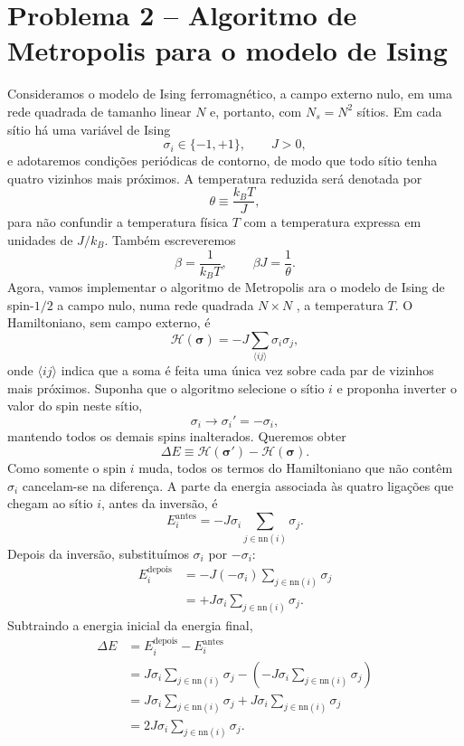 \documentclass[12pt,a4paper]{article}
\newcommand{\nn}{\mathrm{nn}}
\newcommand{\thetaT}{\theta}
\begin{document}
\section*{Problema 2 -- Algoritmo de Metropolis para o modelo de Ising}
%
Consideramos o modelo de Ising ferromagnético, a campo externo nulo, em uma rede quadrada de tamanho linear $N$ e, portanto, com $N_s=N^2$ sítios. Em cada sítio há uma variável de Ising
\[
    \sigma_i\in\{-1,+1\},\qquad J>0,
\]
e adotaremos condições periódicas de contorno, de modo que todo sítio tenha quatro vizinhos mais próximos. A temperatura reduzida será denotada por
\[
    \thetaT\equiv \frac{k_B T}{J},
\]
para não confundir a temperatura física $T$ com a temperatura expressa em unidades de $J/k_B$. Também escreveremos
\[
    \beta=\frac{1}{k_BT},\qquad \beta J=\frac{1}{\thetaT}.
\]
Agora, vamos implementar o algoritmo de Metropolis ara o modelo de Ising de spin-$1/2$ a campo nulo, numa rede quadrada $N \times N$ , a temperatura $T$. O Hamiltoniano, sem campo externo, é
%
\begin{equation}
    \mathcal H(\bm\sigma)
    =-J\sum_{\langle ij\rangle}\sigma_i\sigma_j,
    \label{eq:hamiltoniano}
\end{equation}
%
onde $\langle ij\rangle$ indica que a soma é feita uma única vez sobre cada par de vizinhos mais próximos. Suponha que o algoritmo selecione o sítio $i$ e proponha inverter o valor do spin neste sítio,
%
\begin{equation}
    \sigma_i\longrightarrow \sigma_i'=-\sigma_i,
\end{equation}
%
mantendo todos os demais spins inalterados. Queremos obter
%
\[
    \Delta E\equiv \mathcal H(\bm\sigma')-\mathcal H(\bm\sigma).
\]
%
Como somente o spin $i$ muda, todos os termos do Hamiltoniano que não contêm $\sigma_i$ cancelam-se na diferença. A parte da energia associada às quatro ligações que chegam ao sítio $i$, antes da inversão, é
%
\begin{equation}
    E_i^{\mathrm{antes}}
    =-J\sigma_i\sum_{j\in\nn(i)}\sigma_j.
    \label{eq:Eantes}
\end{equation}
%
Depois da inversão, substituímos $\sigma_i$ por $-\sigma_i$:
%
\begin{align}
    E_i^{\mathrm{depois}}
    &=-J(-\sigma_i)\sum_{j\in\nn(i)}\sigma_j\\
    &=+J\sigma_i\sum_{j\in\nn(i)}\sigma_j.
    \label{eq:Edepois}
\end{align}
%
Subtraindo a energia inicial da energia final,
%
\begin{align}
    \Delta E
    &=E_i^{\mathrm{depois}}-E_i^{\mathrm{antes}}\\
    &=J\sigma_i\sum_{j\in\nn(i)}\sigma_j
      -\left(-J\sigma_i\sum_{j\in\nn(i)}\sigma_j\right)\\
    &=J\sigma_i\sum_{j\in\nn(i)}\sigma_j
      +J\sigma_i\sum_{j\in\nn(i)}\sigma_j\\
    &=2J\sigma_i\sum_{j\in\nn(i)}\sigma_j.
\end{align}
\end{document}

